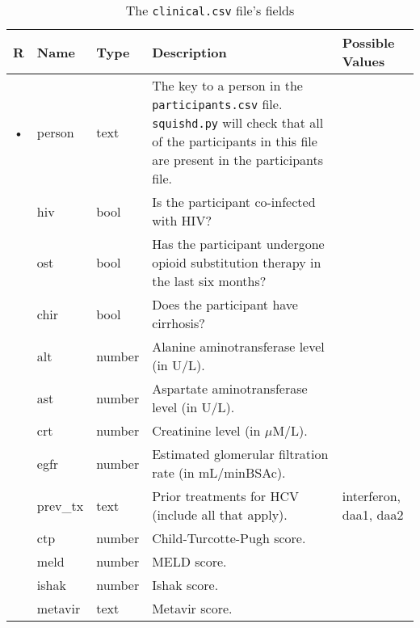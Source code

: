 \documentclass{article}
\begin{document}
\begin{table}
  \centering
  \caption{The \texttt{clinical.csv} file's fields}
  \label{tbl:clinical.csv}
  \begin{tabular}{cllp{6cm}p{4cm}}
    R & Name        & Type      & Description & Possible Values\\ \hline
    • & person      & text    & The key to a person in the \texttt{participants.csv}
    file. \texttt{squishd.py} will check that all of the participants in this file
    are present in the participants file. \\
      & hiv         & bool      & Is the participant co-infected with HIV? &  \\
      & ost         & bool      & Has the participant undergone opioid substitution therapy in the last six months? &  \\
      & chir        & bool      & Does the participant have cirrhosis? & \\
      & alt         & number    & Alanine aminotransferase level (in U/L). & \\
      & ast         & number    & Aspartate aminotransferase level (in U/L). & \\
      & crt         & number    & Creatinine level (in $\mu$M/L). & \\
      & egfr        & number    & Estimated glomerular filtration rate (in mL/minBSAc). & \\
      & prev\_tx    & text    & Prior treatments for HCV (include all that apply). & interferon, daa1, daa2 \\
      & ctp         & number    & Child-Turcotte-Pugh score. & \\
      & meld        & number    & MELD score. & \\
      & ishak       & number    & Ishak score. & \\
      & metavir     & text    & Metavir score. & \\
  \end{tabular}
\end{table}
\end{document}
